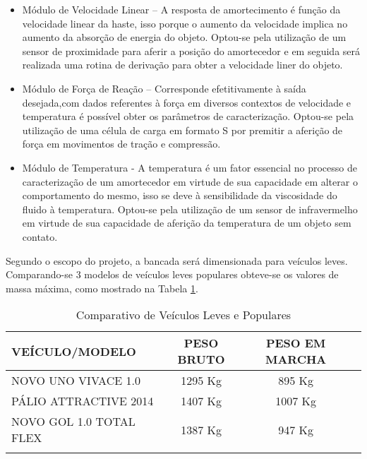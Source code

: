 	\begin{itemize}

		\item Módulo de Velocidade Linear – A resposta de amortecimento é função da velocidade linear da haste, isso porque o aumento da velocidade implica no aumento da absorção de energia do objeto. Optou-se pela utilização de um sensor de proximidade para aferir a posição do amortecedor e em seguida será realizada uma rotina de derivação para obter a velocidade liner do objeto.

		\item Módulo de Força de Reação – Corresponde efetitivamente à saída desejada,com dados referentes à força em diversos contextos de velocidade e temperatura é possível obter os parâmetros de caracterização. Optou-se pela utilização de uma célula de carga em formato S por premitir a aferição de força em movimentos de tração e compressão.

		\item Módulo de Temperatura - A temperatura é um fator essencial no processo de caracterização de um amortecedor em virtude de sua capacidade em alterar o comportamento do mesmo, isso se deve à sensibilidade da viscosidade do fluido à temperatura. Optou-se pela utilização de um sensor de infravermelho em virtude de sua capacidade de aferição da temperatura de um objeto sem contato.

	\end{itemize}


		Segundo o escopo do projeto, a bancada será dimensionada para veículos leves. Comparando-se 3 modelos de veículos leves populares obteve-se os valores de massa máxima, como mostrado na Tabela \ref{comparativocarros}.

		\begin{table}[!h]
		\centering
		\caption{Comparativo de Veículos Leves e Populares}
		\begin{tabular}{ l c c c}
		\hline
		\textbf{VEÍCULO/MODELO} & \textbf{PESO BRUTO} & \textbf{PESO EM MARCHA}\\
		\hline
		NOVO UNO VIVACE 1.0 & 1295 Kg & 895 Kg\\
		\hline
		PÁLIO ATTRACTIVE 2014 & 1407 Kg & 1007 Kg\\
		\hline
		NOVO GOL 1.0 TOTAL FLEX & 1387 Kg & 947 Kg\\
		\hline
		\label{comparativocarros}
		\end{tabular}
		\end{table}

